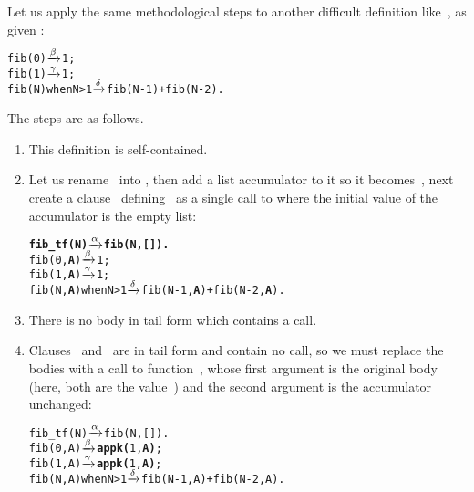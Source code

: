 Let us apply the same methodological steps to another difficult
definition like~, as given :
\begin{alltt}
fib(0)            \(\smashedrightarrow{\beta}\) 1;
fib(1)            \(\smashedrightarrow{\gamma}\) 1;
fib(N) when N > 1 \(\smashedrightarrow{\delta}\) fib(N-1) + fib(N-2).
\end{alltt}
The steps are as follows.
\begin{enumerate}

  \item This definition is self\hyp{}contained.

  \item Let us rename~ into , then add a
    list accumulator to it so it becomes~, next create
    a clause~\clause{\alpha} defining~ as a single
    call to  where the initial value of the accumulator
    is the empty list:
\begin{alltt}
\textbf{fib_tf(N)           \(\smashedrightarrow{\alpha}\) fib(N,[]).}\hfill% \emph{New}
fib(0,\textbf{A})            \(\smashedrightarrow{\beta}\) 1;
fib(1,\textbf{A})            \(\smashedrightarrow{\gamma}\) 1;
fib(N,\textbf{A}) when N > 1 \(\smashedrightarrow{\delta}\) fib(N-1,\textbf{A}) + fib(N-2,\textbf{A}).
\end{alltt}

  \item There is no body in tail form which contains a call.

  \item Clauses \clause{\beta}~and~\clause{\gamma} are in tail form
    and contain no call, so we must replace the bodies with a call to
    function~, whose first argument is the original
    body (here, both are the value~) and the second
    argument is the accumulator unchanged:
\begin{alltt}
fib_tf(N)           \(\smashedrightarrow{\alpha}\) fib(N,[]).
fib(0,A)            \(\smashedrightarrow{\beta}\) \textbf{appk(}1,\textbf{A)};
fib(1,A)            \(\smashedrightarrow{\gamma}\) \textbf{appk(}1,\textbf{A)};
fib(N,A) when N > 1 \(\smashedrightarrow{\delta}\) fib(N-1,A) + fib(N-2,A).
\end{alltt}


\end{enumerate}
